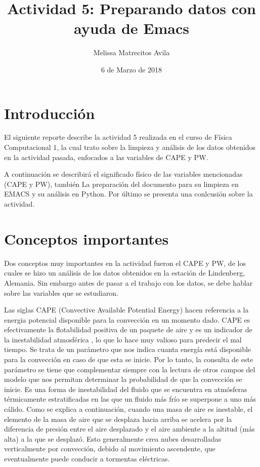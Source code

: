\documentclass{article}
\title{Actividad 5: Preparando datos con ayuda de Emacs}
\author{Melissa Matrecitos Avila}
\date{6 de Marzo de 2018}
\begin{document}
\maketitle

\section{Introducción}
El siguiente reporte describe la actividad 5 realizada en el curso de Física Computacional 1, la cual trato sobre la limpieza y análisis de los datos obtenidos en la actividad pasada, enfocados a las variables de CAPE y PW.

A continuación se describirá el significado físico de las variables mencionadas (CAPE y PW), también La preparación del documento para su limpieza en EMACS y su análisis en Python. Por último se presenta una conlcusión sobre la actividad.

\section{Conceptos importantes}
Dos conceptos muy importantes en la actividad fueron el CAPE y PW, de los cuales se hizo un análisis de los datos obtenidos en la estación de Lindenberg, Alemania. Sin embargo antes de pasar a el trabajo con los datos, se debe hablar sobre las variables que se estudiaron.

Las siglas CAPE (Convective Available Potential Energy) hacen referencia a la energia potencial disponible para la convección en un momento dado. CAPE es efectivamente la flotabilidad positiva de un paquete de aire y es un indicador de la inestabilidad atmosférica , lo que lo hace muy valioso para predecir el mal tiempo. Se trata de un parámetro que nos indica cuanta energía está disponible para la convección en caso de que esta se inicie. Por lo tanto, la consulta de este parámetro se tiene que complementar siempre con la lectura de otros campos del modelo que nos permitan determinar la probabilidad de que la convección se inicie.
Es una forma de inestabilidad del fluido que se encuentra en atmósferas térmicamente estratificadas en las que un fluido más frío se superpone a uno más cálido. Como se explica a continuación, cuando una masa de aire es inestable, el elemento de la masa de aire que se desplaza hacia arriba se acelera por la diferencia de presión entre el aire desplazado y el aire ambiente a la altitud (más alta) a la que se desplazó. Esto generalmente crea nubes desarrolladas verticalmente por convección, debido al movimiento ascendente, que eventualmente puede conducir a tormentas eléctricas.
\end{document}
